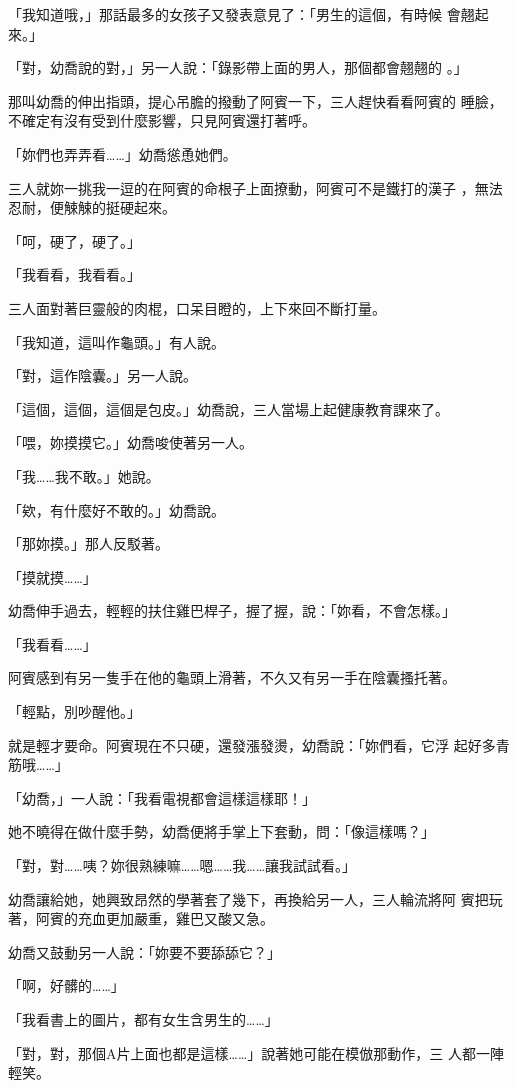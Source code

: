 「我知道哦，」那話最多的女孩子又發表意見了：「男生的這個，有時候
會翹起來。」

「對，幼喬說的對，」另一人說：「錄影帶上面的男人，那個都會翹翹的
。」

那叫幼喬的伸出指頭，提心吊膽的撥動了阿賓一下，三人趕快看看阿賓的
睡臉，不確定有沒有受到什麼影響，只見阿賓還打著呼。

「妳們也弄弄看……」幼喬慫恿她們。

三人就妳一挑我一逗的在阿賓的命根子上面撩動，阿賓可不是鐵打的漢子
，無法忍耐，便觫觫的挺硬起來。

「呵，硬了，硬了。」

「我看看，我看看。」

三人面對著巨靈般的肉棍，口呆目瞪的，上下來回不斷打量。

「我知道，這叫作龜頭。」有人說。

「對，這作陰囊。」另一人說。

「這個，這個，這個是包皮。」幼喬說，三人當場上起健康教育課來了。

「喂，妳摸摸它。」幼喬唆使著另一人。

「我……我不敢。」她說。

「欸，有什麼好不敢的。」幼喬說。

「那妳摸。」那人反駁著。

「摸就摸……」

幼喬伸手過去，輕輕的扶住雞巴桿子，握了握，說：「妳看，不會怎樣。」

「我看看……」

阿賓感到有另一隻手在他的龜頭上滑著，不久又有另一手在陰囊搔托著。

「輕點，別吵醒他。」

就是輕才要命。阿賓現在不只硬，還發漲發燙，幼喬說：「妳們看，它浮
起好多青筋哦……」

「幼喬，」一人說：「我看電視都會這樣這樣耶！」

她不曉得在做什麼手勢，幼喬便將手掌上下套動，問：「像這樣嗎？」

「對，對……咦？妳很熟練嘛……嗯……我……讓我試試看。」

幼喬讓給她，她興致昂然的學著套了幾下，再換給另一人，三人輪流將阿
賓把玩著，阿賓的充血更加嚴重，雞巴又酸又急。

幼喬又鼓動另一人說：「妳要不要舔舔它？」

「啊，好髒的……」

「我看書上的圖片，都有女生含男生的……」

「對，對，那個A片上面也都是這樣……」說著她可能在模倣那動作，三
人都一陣輕笑。

